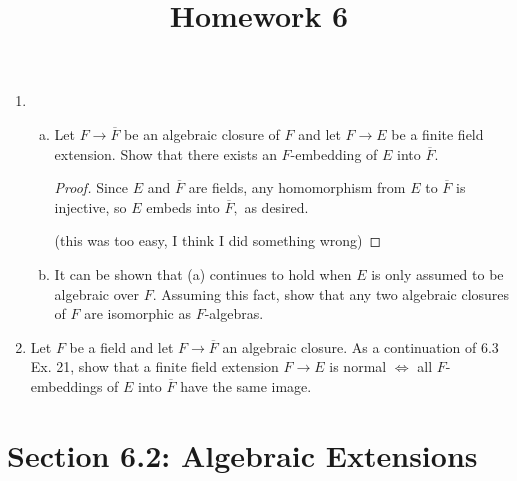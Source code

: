 \documentclass{article}
\begin{document}
\title{Homework 6}
\maketitle
\thispagestyle{fancy}

\begin{enumerate}
	\item
		\begin{enumerate}[(a)]
			\item Let $F\to \overline{F}$ be an algebraic closure of $F$ and let $F\to E$ be a finite field extension. Show that there exists an $F$-embedding of $E$ into $\overline{F}.$ 
				\begin{proof}
					Since $E$ and $\overline{F}$ are fields, any homomorphism from $E$ to $\overline{F}$ is injective, so $E$ embeds into $\overline{F},$ as desired.

					(this was too easy, I think I did something wrong)
				\end{proof}

			\item It can be shown that (a) continues to hold when $E$ is only assumed to be algebraic over $F.$ Assuming this fact, show that any two algebraic closures of $F$ are isomorphic as $F$-algebras.
				
		\end{enumerate}

	\item Let $F$ be a field and let $F\to \overline{F}$ an algebraic closure. As a continuation of 6.3 Ex. 21, show that a finite field extension $F\to E$ is normal $\iff$ all $F$-embeddings of $E$ into $\overline{F}$ have the same image.
		
\end{enumerate}

\section*{Section 6.2: Algebraic Extensions}
\end{document}
